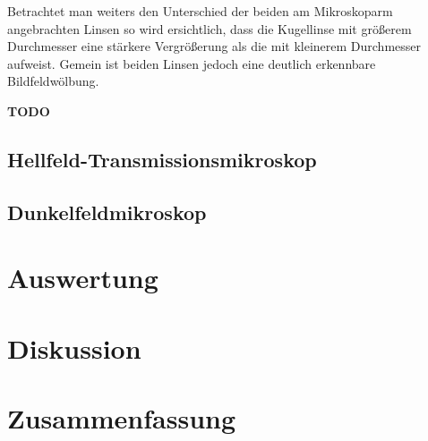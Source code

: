 \documentclass[ngerman]{scrartcl}
\begin{document}
\setcaphanging
%
Betrachtet man weiters den Unterschied der beiden am Mikroskoparm angebrachten Linsen so wird ersichtlich, dass die Kugellinse mit größerem Durchmesser eine stärkere Vergrößerung als die mit kleinerem Durchmesser aufweist. Gemein ist beiden Linsen jedoch eine deutlich erkennbare Bildfeldwölbung.

\textbf{TODO}


\subsection{Hellfeld-Transmissionsmikroskop}
\label{subsec:durchfuehrung_hellfeld}


\subsection{Dunkelfeldmikroskop}
\label{subsec:durchfuehrung_dunkelfeld}


\section{Auswertung}
\label{sec:auswertung}



\section{Diskussion}
\label{sec:diskussion}



\section{Zusammenfassung}
\label{sec:zusammenfassung}



\clearpage
\printbibliography

\listoffigures

\listoftables
\end{document}
